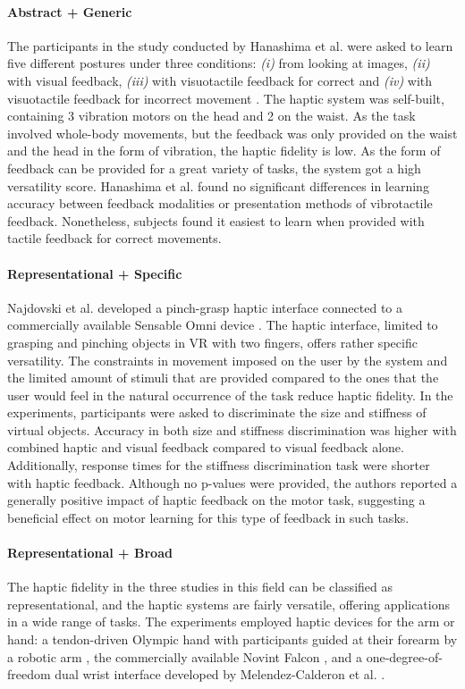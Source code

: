 \paragraph{Abstract + Generic} \label{sec:abstractgeneric}
The participants in the study conducted by Hanashima et al. were asked to learn five different postures under three conditions: \textit{(i)} from looking at images, \textit{(ii)} with visual feedback, \textit{(iii)} with visuotactile feedback for correct and \textit{(iv)} with visuotactile feedback for incorrect movement \cite{Hanashima2023}. The haptic system was self-built, containing 3 vibration motors on the head and 2 on the waist. As the task involved whole-body movements, but the feedback was only provided on the waist and the head in the form of vibration, the haptic fidelity is low. As the form of feedback can be provided for a great variety of tasks, the system got a high versatility score. 
Hanashima et al. found no significant differences in learning accuracy between feedback modalities or presentation methods of vibrotactile feedback. Nonetheless, subjects found it easiest to learn when provided with tactile feedback for correct movements.


\paragraph{Representational + Specific} \label{sec:representationalspecific}
Najdovski et al. developed a pinch-grasp haptic interface connected to a commercially available Sensable Omni device \cite{Najdovski2020}. The haptic interface, limited to grasping and pinching objects in VR with two fingers, offers rather specific versatility. The constraints in movement imposed on the user by the system and the limited amount of stimuli that are provided compared to the ones that the user would feel in the natural occurrence of the task reduce haptic fidelity. 
In the experiments, participants were asked to discriminate the size and stiffness of virtual objects. Accuracy in both size and stiffness discrimination was higher with combined haptic and visual feedback compared to visual feedback alone. Additionally, response times for the stiffness discrimination task were shorter with haptic feedback. Although no p-values were provided, the authors reported a generally positive impact of haptic feedback on the motor task, suggesting a beneficial effect on motor learning for this type of feedback in such tasks. 


\paragraph{Representational + Broad} \label{sec:representationalbroad}
The haptic fidelity in the three studies in this field can be classified as representational, and the haptic systems are fairly versatile, offering applications in a wide range of tasks. The experiments employed haptic devices for the arm or hand: a tendon-driven Olympic hand with participants guided at their forearm by a robotic arm \cite{Chappell2022}, the commercially available Novint Falcon \cite{Gambaro2014}, and a one-degree-of-freedom dual wrist interface \cite{Perez2023} developed by Melendez-Calderon et al. \cite{Melendez-Calderon2011Hi5:Control}.

